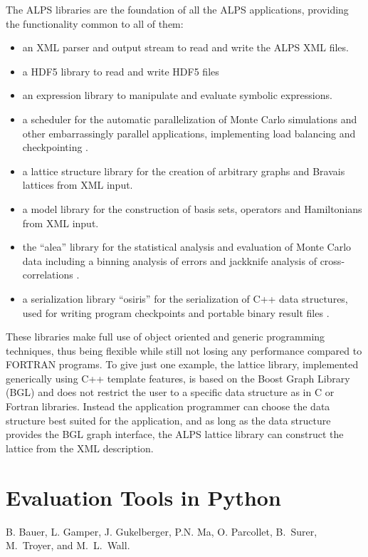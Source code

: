 \documentclass[12pt]{iopart}
\begin{document}
The ALPS libraries are the foundation of all the ALPS applications, providing the functionality common to all of them:
\begin{itemize}
\item an XML parser and output stream to read and write the ALPS XML files.
\item a HDF5 library to read and write HDF5 files
\item an expression library to manipulate and evaluate symbolic expressions.
\item a scheduler for the automatic parallelization of Monte Carlo simulations and other embarrassingly parallel applications, implementing load balancing and checkpointing \cite{palm}.
\item a lattice structure library for the creation of arbitrary graphs and Bravais lattices from XML input.
\item a model library for the construction of basis sets, operators and Hamiltonians from XML input.
\item the ``alea'' library for the statistical analysis and evaluation of Monte Carlo data including a binning analysis of errors and jackknife analysis of cross-correlations \cite{palm}.
\item a serialization library ``osiris'' for the serialization of C++ data structures, used for writing program checkpoints and portable binary result files \cite{palm}.
\end{itemize}
These libraries make full use of object oriented and generic\cite{CE} programming techniques, thus being flexible while still not losing any performance compared to FORTRAN programs. To give just one example, the lattice library, implemented generically using C++ template features, is based on the Boost Graph Library\cite{BGL,boost} (BGL) and does not restrict the user to a specific data structure as in C or Fortran libraries. Instead the application programmer can choose the data structure best suited for the application, and as long as the data structure provides the BGL graph interface, the ALPS lattice library can construct the lattice from the XML description.




\section{Evaluation Tools in Python} \label{sct:python}
 B. Bauer, L. Gamper, J. Gukelberger, P.N. Ma, O. Parcollet, B.~Surer, M.~Troyer, and M.~L.~Wall. 
\end{document}
